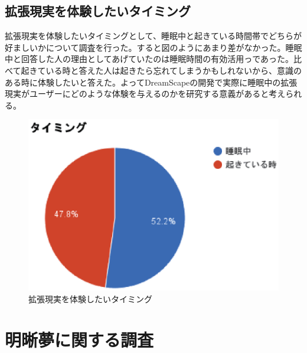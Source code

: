 \subsection{拡張現実を体験したいタイミング}
拡張現実を体験したいタイミングとして、睡眠中と起きている時間帯でどちらが好ましいかについて調査を行った。すると図のようにあまり差がなかった。睡眠中と回答した人の理由としてあげていたのは睡眠時間の有効活用っであった。比べて起きている時と答えた人は起きたら忘れてしまうかもしれないから、意識のある時に体験したいと答えた。よってDreamScapeの開発で実際に睡眠中の拡張現実がユーザーにどのような体験を与えるのかを研究する意義があると考えられる。

\begin{figure}[htbp]
\begin{center}
\includegraphics[width=15cm]{eps/timing.eps}
\caption{拡張現実を体験したいタイミング}
\label{拡張現実を体験したいタイミング}
\end{center}
\end{figure}

\section{明晰夢に関する調査}
